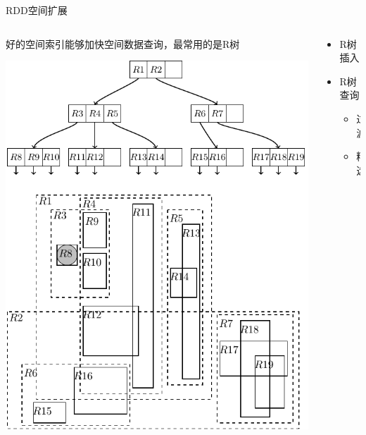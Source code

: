 \begin{frame}[c]{RDD空间扩展}
    \begin{columns}
        \begin{column}{0.6 \textwidth}
        好的空间索引能够加快空间数据查询，最常用的是R树

        \vspace{1em}
        \includegraphics[scale=0.4]{figures/rtree.pdf}
        \end{column}

        \pause
        \begin{column}{0.4 \textwidth}
            \begin{itemize}
                \item R树插入
                \pause
                \item R树查询
                    \begin{itemize}
                        \pause
                        \item 过滤
                        \pause
                        \item 精选
                    \end{itemize}
            \end{itemize}
        \end{column}
    \end{columns}
\end{frame}

